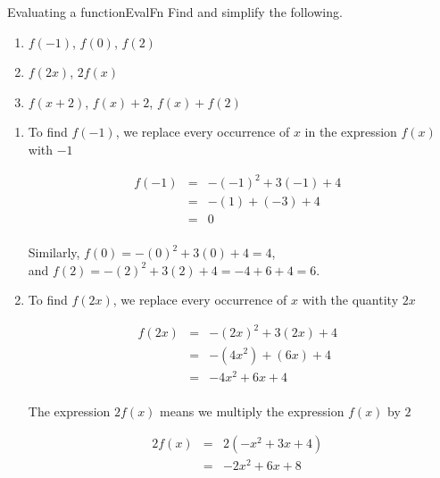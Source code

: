 \begin{example}{Evaluating a function}{EvalFn}
	Find and simplify the following.
	
	\begin{enumerate}
		
		\item $f(-1)$, $f(0)$, $f(2)$
		
		\item  $f(2x)$, $2 f(x)$
		
		\item $f(x+2)$, $f(x)+2$, $f(x) + f(2)$
		
	\end{enumerate}
\end{example}
\begin{solution}
	
	 \begin{enumerate} \item  To find $f(-1)$, we replace every occurrence of $x$ in the expression $f(x)$ with $-1$
			
			\[ \begin{array}{rclr}  
			f(-1) & = & -(-1)^2 + 3(-1) + 4 & \\
			& = & -(1) + (-3) + 4 & \\ 
			& = & 0 & \\ 
			\end{array} \]
			
			
			Similarly, $f(0) = -(0)^2 + 3(0) + 4 = 4$, \\
			
			and \hspace{9mm} $f(2) = -(2)^2 + 3(2) + 4 = -4+6+4 = 6$.
			
			\item To find $f(2x)$, we replace every occurrence of $x$ with the quantity $2x$
			
			\[ \begin{array}{rclr}  
			f(2x) & = & -(2x)^2 + 3(2x) + 4 & \\
			& = & -(4x^2) + (6x) + 4 & \\
			& = & -4x^2+6x+4 & \\ 
			\end{array} \]
			
			The expression $2f(x)$ means we multiply the expression $f(x)$ by $2$
			
			\[ \begin{array}{rclr}  
			2f(x) & = & 2\left(-x^2 + 3x + 4\right) & \\
			& = & -2x^2 + 6x + 8 \\ 
			\end{array} \]
			

\end{enumerate}
\end{solution}
